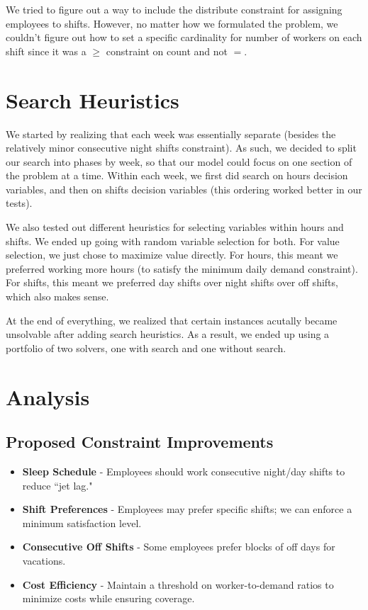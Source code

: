 \documentclass[11pt]{article}
\begin{document}
We tried to figure out a way to include the distribute constraint for assigning
employees to shifts. However, no matter how we formulated the problem,
we couldn't figure out how to set a specific cardinality for number of workers on each
shift since it was a $\geq$ constraint on count and not $=$.

\section*{Search Heuristics}
We started by realizing that each week was essentially separate (besides the relatively minor consecutive night shifts constraint). As such, we decided to split our search into phases by week, so that our model could focus on one section of the problem at a time. Within each week, we first did search on hours decision variables, and then on shifts decision variables (this ordering worked better in our tests). 

We also tested out different heuristics for selecting variables within hours and shifts. We ended up going with random variable selection for both. For value selection, we just chose to maximize value directly. For hours, this meant we preferred working more hours (to satisfy the minimum daily demand constraint). For shifts, this meant we preferred day shifts over night shifts over off shifts, which also makes sense.

At the end of everything, we realized that certain instances acutally became unsolvable after adding search heuristics. As a result, we ended up using a portfolio of two solvers, one with search and one without search.

\section*{Analysis}

\subsection*{Proposed Constraint Improvements}
\begin{itemize}
    \item \textbf{Sleep Schedule} - Employees should work consecutive night/day shifts to reduce ``jet lag."
    \item \textbf{Shift Preferences} - Employees may prefer specific shifts; we can enforce a minimum satisfaction level.
    \item \textbf{Consecutive Off Shifts} - Some employees prefer blocks of off days for vacations.
    \item \textbf{Cost Efficiency} - Maintain a threshold on worker-to-demand ratios to minimize costs while ensuring coverage.
\end{itemize}
\end{document}
